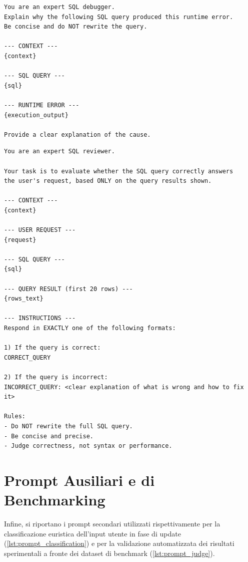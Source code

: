 \begin{lstlisting}[basicstyle=\ttfamily\footnotesize, frame=single, breaklines=true, caption={Struttura del prompt \texttt{explanation\_prompt}.}, label={lst:prompt_explanation}]
You are an expert SQL debugger.
Explain why the following SQL query produced this runtime error.
Be concise and do NOT rewrite the query.

--- CONTEXT ---
{context}

--- SQL QUERY ---
{sql}

--- RUNTIME ERROR ---
{execution_output}

Provide a clear explanation of the cause.
\end{lstlisting}

\begin{lstlisting}[basicstyle=\ttfamily\footnotesize, frame=single, breaklines=true, caption={Struttura del prompt \texttt{evaluation\_prompt}.}, label={lst:prompt_evaluation}]
You are an expert SQL reviewer.

Your task is to evaluate whether the SQL query correctly answers
the user's request, based ONLY on the query results shown.

--- CONTEXT ---
{context}

--- USER REQUEST ---
{request}

--- SQL QUERY ---
{sql}

--- QUERY RESULT (first 20 rows) ---
{rows_text}

--- INSTRUCTIONS ---
Respond in EXACTLY one of the following formats:

1) If the query is correct:
CORRECT_QUERY

2) If the query is incorrect:
INCORRECT_QUERY: <clear explanation of what is wrong and how to fix it>

Rules:
- Do NOT rewrite the full SQL query.
- Be concise and precise.
- Judge correctness, not syntax or performance.
\end{lstlisting}

\section{Prompt Ausiliari e di Benchmarking}
Infine, si riportano i prompt secondari utilizzati rispettivamente per la classificazione euristica dell'input utente in fase di update (\ref{lst:prompt_classification}) e per la validazione automatizzata dei risultati sperimentali a fronte dei dataset di benchmark (\ref{lst:prompt_judge}).

